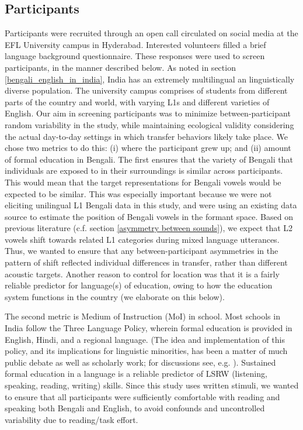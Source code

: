 \documentclass[12 pt]{article}
\begin{document}
\subsection{Participants} \label{participants}
Participants were recruited through an open call circulated on social media at the EFL University campus in Hyderabad. Interested volunteers filled a brief language background questionnaire. These responses were used to screen participants, in the manner described below. 
As noted in section \ref{bengali_english_in_india}, India has an extremely multilingual an linguistically diverse population. The university campus comprises of students from different parts of the country and world, with varying L1s and different varieties of English. Our aim in screening participants was to minimize between-participant random variability in the study, while maintaining ecological validity considering the actual day-to-day settings in which transfer behaviors likely take place. We chose two metrics to do this: (i) where the participant grew up; and (ii) amount of formal education in Bengali. The first ensures that the variety of Bengali that individuals are exposed to in their surroundings is similar across participants. This would mean that the target representations for Bengali vowels would be expected to be similar. This was especially important because we were not eliciting unilingual L1 Bengali data in this study, and were using an existing data source to estimate the position of Bengali vowels in the formant space. Based on previous literature (c.f. section \ref{asymmetry between sounds}), we expect that L2 vowels shift towards related L1 categories during mixed language utterances. Thus, we wanted to ensure that any between-participant asymmetries in the pattern of shift reflected individual differences in transfer, rather than different acoustic targets. Another reason to control for location was that it is a fairly reliable predictor for language(s) of education, owing to how the education system functions in the country (we elaborate on this below).

The second metric is Medium of Instruction (MoI) in school. Most schools in India follow the Three Language Policy, wherein formal education is provided in English, Hindi, and a regional language. (The idea and implementation of this policy, and its implications for linguistic minorities, has been a matter of much public debate as well as scholarly work; for discussions see, e.g. \cite{tollefson2014language, jhingran2009hundreds, khubchandani1997language, mohanty2009multilingual, ramanathan2005rethinking}). Sustained formal education in a language is a reliable predictor of LSRW (listening, speaking, reading, writing) skills. Since this study uses written stimuli, we wanted to ensure that all participants were sufficiently comfortable with reading and speaking both Bengali and English, to avoid confounds and uncontrolled variability due to reading/task effort.  
\end{document}
